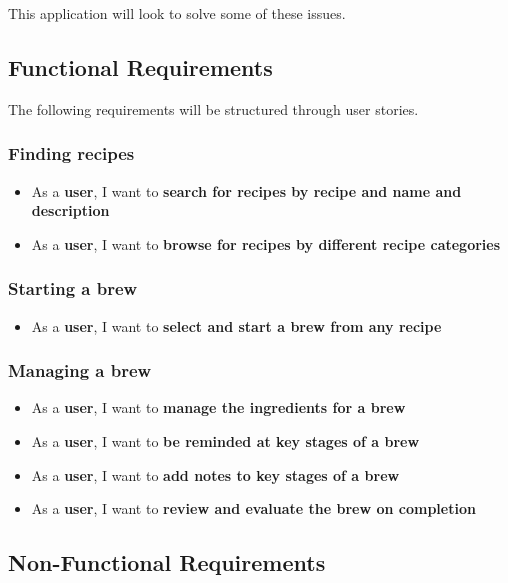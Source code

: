 This application will look to solve some of these issues.

\subsection{Functional Requirements} \label{a-d--requirements--functional}

The following requirements will be structured through user stories. %

\subsubsection{Finding recipes}

\begin{itemize}
  \item As a \textbf{user}, I want to \textbf{search for recipes by recipe and name and description}
  \item As a \textbf{user}, I want to \textbf{browse for recipes by different recipe categories}
\end{itemize}

\subsubsection{Starting a brew}

\begin{itemize}
  \item As a \textbf{user}, I want to \textbf{select and start a brew from any recipe}
\end{itemize}

\subsubsection{Managing a brew}

\begin{itemize}
  \item As a \textbf{user}, I want to \textbf{manage the ingredients for a brew}
  \item As a \textbf{user}, I want to \textbf{be reminded at key stages of a brew}
  \item As a \textbf{user}, I want to \textbf{add notes to key stages of a brew}
  \item As a \textbf{user}, I want to \textbf{review and evaluate the brew on completion}
\end{itemize}

\subsection{Non-Functional Requirements} \label{a-d--requirements--non-functional}

